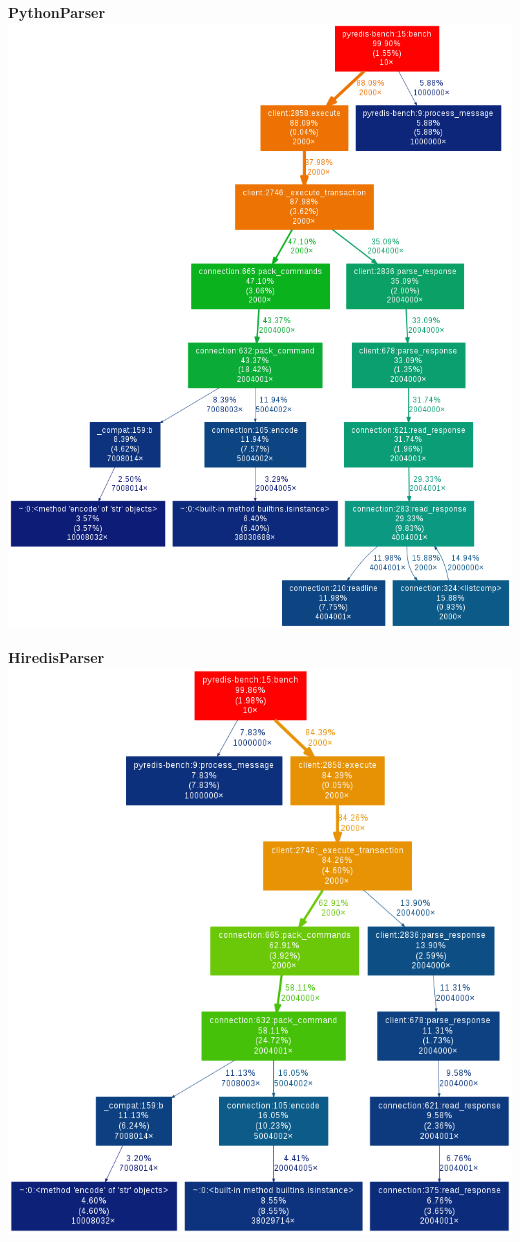 \documentclass[a4paper, 11pt]{report}
\begin{document}
\begin{minipage}[t]{0.5\linewidth}
\textbf{PythonParser}\\

\includegraphics[width=0.9\linewidth]{pics/pipe-py.png}
\end{minipage}
\quad
\begin{minipage}[t]{0.5\linewidth}
\textbf{HiredisParser}\\

\includegraphics[width=0.9\linewidth]{pics/pipe-hi.png}
\end{minipage}
\end{document}
